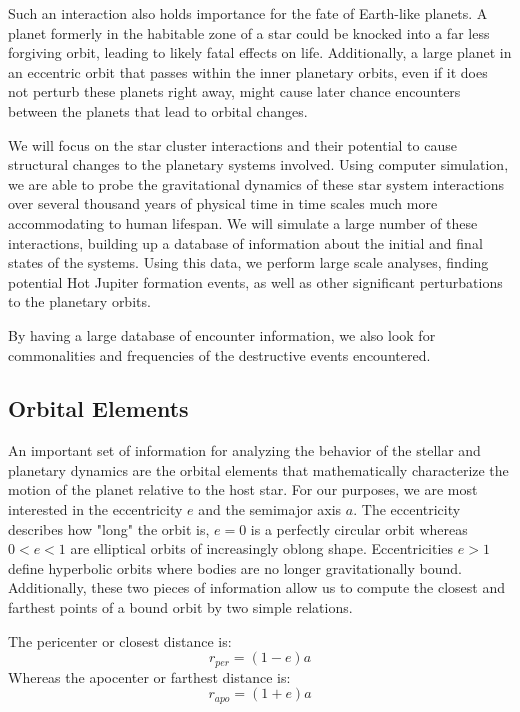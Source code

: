\documentclass[12pt]{article}
\begin{document}
Such an interaction also holds importance for the fate of Earth-like planets.
A planet formerly in the habitable zone of a star could be knocked into a far less
forgiving orbit, leading to likely fatal effects on life. Additionally, a
large planet in an eccentric orbit that passes within the inner planetary orbits,
even if it does not perturb these planets right away, might cause later chance
encounters between the planets that lead to orbital changes.

We will focus on the star cluster interactions and their potential to 
cause structural changes to the planetary systems involved. Using computer simulation,
we are able to probe the gravitational dynamics of these star system 
interactions over several thousand years of physical time 
in time scales much more accommodating to human lifespan. We will simulate
a large number of these interactions, building up a database of information about
the initial and final states of the systems. Using this data, we perform large
scale analyses, finding potential Hot Jupiter formation events, as well as other
significant perturbations to the planetary orbits.

By having a large database of encounter information, we also look for commonalities
and frequencies of the destructive events encountered. 

\subsection{Orbital Elements}

    An important set of information for analyzing the behavior of the stellar and
    planetary dynamics are the orbital elements that mathematically 
    characterize the motion of the planet relative to the host star. 
    For our purposes, we are most interested in the eccentricity $e$ and the
    semimajor axis $a$. The eccentricity describes how "long" the orbit is, $e=0$
    is a perfectly circular orbit whereas $0<e<1$ are elliptical orbits of increasingly
    oblong shape. Eccentricities $e>1$ define hyperbolic orbits where bodies are no longer
    gravitationally bound. Additionally, these two pieces of information allow us to 
    compute the closest and farthest points of a bound orbit by two simple relations.

    The pericenter or closest distance is:
    \begin{equation}
        r_{per} = (1 - e) a
    \end{equation}
    Whereas the apocenter or farthest distance is:
    \begin{equation}
        r_{apo} = (1 + e) a
    \end{equation}
\end{document}

